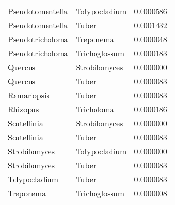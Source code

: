 \documentclass[border=1mm]{standalone}
\begin{document}
\begin{longtable}[t]{lll}
\addlinespace
Pseudotomentella & Tolypocladium & 0.0000586\\
Pseudotomentella & Tuber & 0.0001432\\
Pseudotricholoma & Treponema & 0.0000048\\
Pseudotricholoma & Trichoglossum & 0.0000183\\
Quercus & Strobilomyces & 0.0000000\\
\addlinespace
Quercus & Tuber & 0.0000083\\
Ramariopsis & Tuber & 0.0000083\\
Rhizopus & Tricholoma & 0.0000186\\
Scutellinia & Strobilomyces & 0.0000000\\
Scutellinia & Tuber & 0.0000083\\
\addlinespace
Strobilomyces & Tolypocladium & 0.0000000\\
Strobilomyces & Tuber & 0.0000083\\
Tolypocladium & Tuber & 0.0000083\\
Treponema & Trichoglossum & 0.0000008\\
\bottomrule
\end{longtable}
\end{document}
